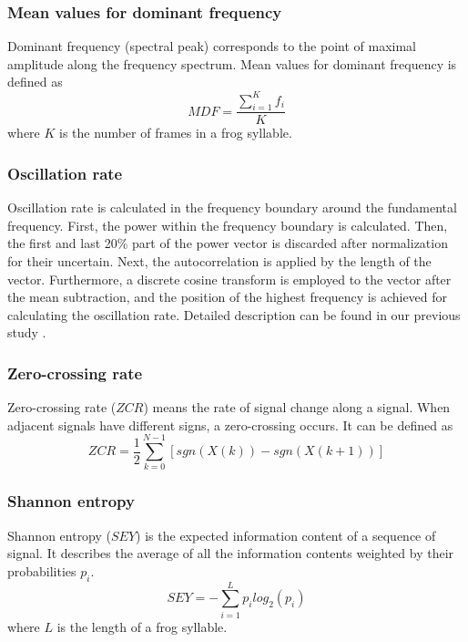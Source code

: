 \subsubsection{Mean values for dominant frequency}
Dominant frequency (spectral peak) corresponds to the point of maximal amplitude along the frequency spectrum. Mean values for dominant frequency is defined as
\begin{equation}
MDF=\frac{\sum_{i=1}^{K}f_{i}}{K}
\end{equation}
 where $K$ is the number of frames in a frog syllable.


\subsubsection{Oscillation rate}
Oscillation rate is calculated in the frequency boundary around the fundamental frequency. First, the power within the frequency boundary is calculated. Then, the first and last 20\% part of the power vector is discarded after normalization for their uncertain. Next, the autocorrelation is applied by the length of the vector. Furthermore, a discrete cosine transform is employed to the vector after the mean subtraction, and the position of the highest frequency is achieved for calculating the oscillation rate. Detailed description can be found in our previous study \citep{Xie1504:Acoustic}.


\subsubsection{Zero-crossing rate}
Zero-crossing rate ($ZCR$) means the rate of signal change along a signal. When adjacent signals have different signs, a zero-crossing occurs. It can be defined as
\begin{equation}
ZCR = \frac{1}{2}\sum_{k=0}^{N-1}[sgn(X(k))-sgn(X(k+1))]
\end{equation}

\subsubsection{Shannon entropy}
Shannon entropy ($SEY$) is the expected information content of a sequence of signal. It describes the average of all the information contents weighted by their probabilities $p_{i}$.
\begin{equation}
SEY = -\sum_{i=1}^{L}p_{i}log_{2}(p_{i})
\end{equation}
where $L$ is the length of a frog syllable.


